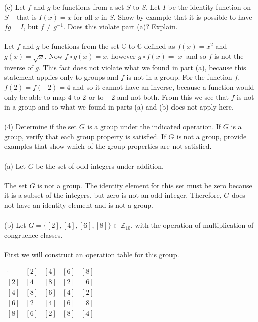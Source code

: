 \documentclass[11pt,a4paper]{article}
\begin{document}
(c) Let $f$ and $g$ be functions from a set $S$ to $S$. Let $I$ be the identity function
on $S$ -- that is $I(x) = x$ for all $x$ in $S$. Show by example that it is possible
to have $fg = I$, but $f \neq g^{-1}$. Does this violate part (a)? Explain.\\
~\\
Let $f$ and $g$ be functions from the set $\mathbb{C}$ to $\mathbb{C}$ defined as $f(x)=x^2$ and $g(x)=\sqrt{x}$. Now $f\circ g (x) = x$, however $g\circ f (x) = |x|$ and so $f$ is not the inverse of $g$. This fact does not violate what we found in part (a), because this statement applies only to groups and $f$ is not in a group. For the function $f$, $f(2) = f(-2) = 4$ and so it cannot have an inverse, because a function would only be able to map $4$ to $2$ or to $-2$ and not both. From this we see that $f$ is not in a group and so what we found in parts (a) and (b) does not apply here.\\
~\\
(4) Determine if the set $G$ is a group under the indicated operation. If $G$ is
a group, verify that each group property is satisfied. If $G$ is not a group,
provide examples that show which of the group properties are not satisfied.\\
~\\
(a) Let $G$ be the set of odd integers under addition.\\
~\\
The set $G$ is not a group. The identity element for this set must be zero because it is a subset of the integers, but zero is not an odd integer. Therefore, $G$ does not have an identity element and is not a group.\\
~\\
(b) Let $G = \{[2], [4], [6], [8]\} \subset \mathbb{Z}_{10}$, with the operation of multiplication
of congruence classes.\\
~\\
First we will construct an operation table for this group.
\begin{center}
$
\begin{array}{c|c|c|c|c}
\cdot & [2] & [4] & [6] & [8] \\\hline
[2] & [4] & [8] & [2] & [6] \\\hline
[4] & [8] & [6] & [4] & [2] \\\hline
[6] & [2] & [4] & [6] & [8] \\\hline
[8] & [6] & [2] & [8] & [4] \\
\end{array}
$
\end{center}
\end{document}
